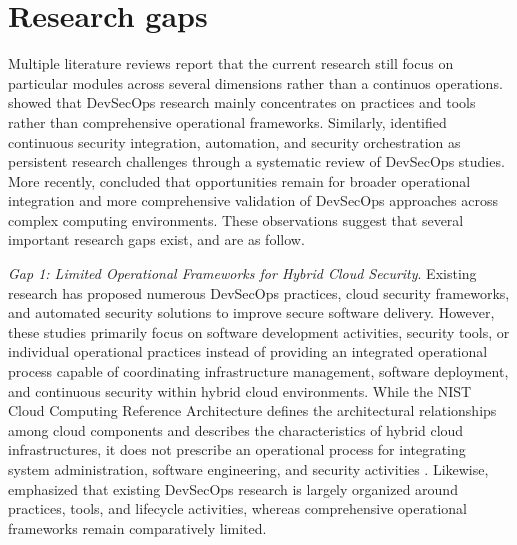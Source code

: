 \section{Research gaps}
\label{sec:gaps}
Multiple literature reviews report that the current research still focus on particular modules across several dimensions rather than a continuos operations. \cite{Myrbakken2017DevSecOps} showed that DevSecOps research mainly concentrates on practices and tools rather than comprehensive operational frameworks. Similarly, \cite{Rajapakse2021DevSecOpsSLR} identified continuous security integration, automation, and security orchestration as persistent research challenges through a systematic review of DevSecOps studies. More recently, \cite{Zhao2024DevSecOpsMLR} concluded that opportunities remain for broader operational integration and more comprehensive validation of DevSecOps approaches across complex computing environments. These observations suggest that several important research gaps exist, and are as follow.

\vspace{0.3cm}

\textit{Gap 1: Limited Operational Frameworks for Hybrid Cloud Security}.
Existing research has proposed numerous DevSecOps practices, cloud security frameworks, and automated security solutions to improve secure software delivery. However, these studies primarily focus on software development activities, security tools, or individual operational practices instead of providing an integrated operational process capable of coordinating infrastructure management, software deployment, and continuous security within hybrid cloud environments. While the NIST Cloud Computing Reference Architecture defines the architectural relationships among cloud components and describes the characteristics of hybrid cloud infrastructures, it does not prescribe an operational process for integrating system administration, software engineering, and security activities \cite{Liu2011NISTRA}. Likewise, \cite{Myrbakken2017DevSecOps,Zhao2024DevSecOpsMLR} emphasized that existing DevSecOps research is largely organized around practices, tools, and lifecycle activities, whereas comprehensive operational frameworks remain comparatively limited.

\vspace{0.3cm}


